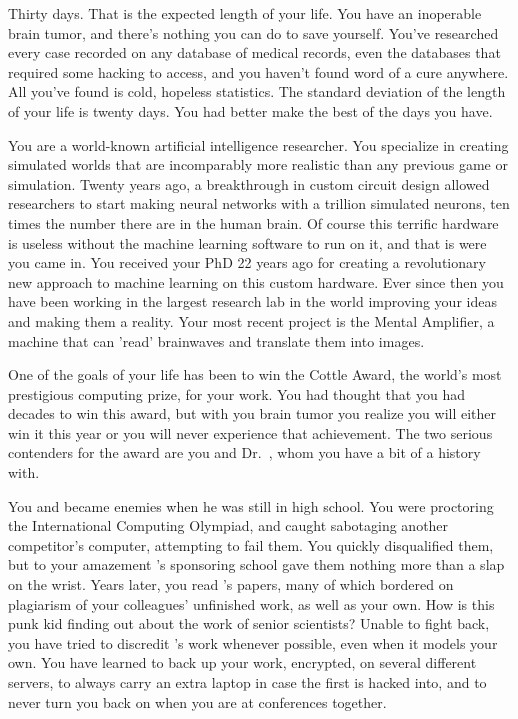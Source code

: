 \documentclass[char]{guildcamp1}
\begin{document}
\name{\cScientist{}}

Thirty days.  That is the expected length of your life.  You have an inoperable brain tumor, and there's nothing you can do to save yourself.  You've researched every case recorded on any database of medical records, even the databases that required some hacking to access, and you haven't found word of a cure anywhere.  All you've found is cold, hopeless statistics.  The standard deviation of the length of your life is twenty days.  You had better make the best of the days you have.

You are a world-known artificial intelligence researcher. You specialize in creating simulated worlds that are incomparably more realistic than any previous game or simulation.  Twenty years ago, a breakthrough in custom circuit design allowed researchers to start making neural networks with a trillion simulated neurons, ten times the number there are in the human brain.  Of course this terrific hardware is useless without the machine learning software to run on it, and that is were you came in.  You received your PhD  22 years ago for creating a revolutionary new approach to machine learning on this custom hardware.  Ever since then you have been working in the largest research lab in the world improving your ideas and making them a reality. Your most recent project is the Mental Amplifier, a machine that can 'read' brainwaves and translate them into images.

One of the goals of your life has been to win the Cottle Award, the world's most prestigious computing prize, for your work.  You had thought that you had decades to win this award, but with you brain tumor you realize you will either win it this year or you will never experience that achievement.  The two serious contenders for the award are you and Dr.~\cRival{\intro{}}, whom you have a bit of a history with.  

You and \cRival{} became enemies when he was still in high school.  You were proctoring the International Computing Olympiad, and caught \cRival{} sabotaging another competitor's computer, attempting to fail them. You quickly disqualified them, but to your amazement \cRival{}'s sponsoring school gave them nothing more than a slap on the wrist. Years later, you read \cRival{}'s papers, many of which bordered on plagiarism of your colleagues' unfinished work, as well as your own. How is this punk kid finding out about the work of senior scientists? Unable to fight back, you have tried to discredit \cRival{}'s work whenever possible, even when it models your own. You have learned to back up your work, encrypted, on several different servers, to always carry an extra laptop in case the first is hacked into, and to never turn you back on \cRival{} when you are at conferences together. 
\end{document}
